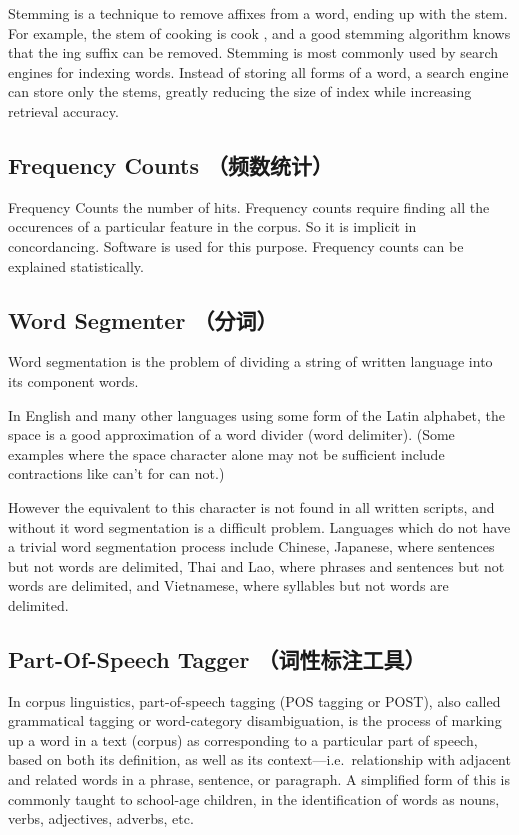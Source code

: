 \documentclass{article}
\begin{document}
Stemming is a technique to remove affixes from a word, ending up with
the stem. For example, the stem of cooking is cook , and a good stemming
algorithm knows that the ing suffix can be removed. Stemming is most
commonly used by search engines for indexing words. Instead of storing
all forms of a word, a search engine can store only the stems, greatly
reducing the size of index while increasing retrieval accuracy.

\subsection{Frequency Counts
（频数统计）}\label{frequency-counts-ux9891ux6570ux7edfux8ba1}

Frequency Counts the number of hits. Frequency counts require finding
all the occurences of a particular feature in the corpus. So it is
implicit in concordancing. Software is used for this purpose. Frequency
counts can be explained statistically.

\subsection{Word Segmenter （分词）}\label{word-segmenter-ux5206ux8bcd}

Word segmentation is the problem of dividing a string of written
language into its component words.

In English and many other languages using some form of the Latin
alphabet, the space is a good approximation of a word divider (word
delimiter). (Some examples where the space character alone may not be
sufficient include contractions like can't for can not.)

However the equivalent to this character is not found in all written
scripts, and without it word segmentation is a difficult problem.
Languages which do not have a trivial word segmentation process include
Chinese, Japanese, where sentences but not words are delimited, Thai and
Lao, where phrases and sentences but not words are delimited, and
Vietnamese, where syllables but not words are delimited.

\subsection{Part-Of-Speech Tagger
（词性标注工具）}\label{part-of-speech-tagger-ux8bcdux6027ux6807ux6ce8ux5de5ux5177}

In corpus linguistics, part-of-speech tagging (POS tagging or POST),
also called grammatical tagging or word-category disambiguation, is the
process of marking up a word in a text (corpus) as corresponding to a
particular part of speech, based on both its definition, as well as its
context---i.e.~relationship with adjacent and related words in a phrase,
sentence, or paragraph. A simplified form of this is commonly taught to
school-age children, in the identification of words as nouns, verbs,
adjectives, adverbs, etc.
\end{document}
